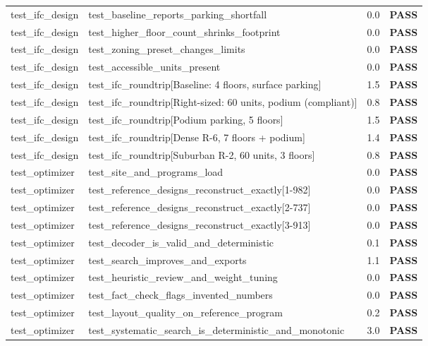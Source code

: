 \documentclass[10pt]{article}
\begin{document}
{\begin{longtable}{p{2.6cm}p{9.6cm}p{1.0cm}p{1.4cm}}
test\_ifc\_design & test\_baseline\_reports\_parking\_shortfall & 0.0 & \textcolor{pass}{\textbf{PASS}} \\
test\_ifc\_design & test\_higher\_floor\_count\_shrinks\_footprint & 0.0 & \textcolor{pass}{\textbf{PASS}} \\
test\_ifc\_design & test\_zoning\_preset\_changes\_limits & 0.0 & \textcolor{pass}{\textbf{PASS}} \\
test\_ifc\_design & test\_accessible\_units\_present & 0.0 & \textcolor{pass}{\textbf{PASS}} \\
test\_ifc\_design & test\_ifc\_roundtrip[Baseline: 4 floors, surface parking] & 1.5 & \textcolor{pass}{\textbf{PASS}} \\
test\_ifc\_design & test\_ifc\_roundtrip[Right-sized: 60 units, podium (compliant)] & 0.8 & \textcolor{pass}{\textbf{PASS}} \\
test\_ifc\_design & test\_ifc\_roundtrip[Podium parking, 5 floors] & 1.5 & \textcolor{pass}{\textbf{PASS}} \\
test\_ifc\_design & test\_ifc\_roundtrip[Dense R-6, 7 floors + podium] & 1.4 & \textcolor{pass}{\textbf{PASS}} \\
test\_ifc\_design & test\_ifc\_roundtrip[Suburban R-2, 60 units, 3 floors] & 0.8 & \textcolor{pass}{\textbf{PASS}} \\
test\_optimizer & test\_site\_and\_programs\_load & 0.0 & \textcolor{pass}{\textbf{PASS}} \\
test\_optimizer & test\_reference\_designs\_reconstruct\_exactly[1-982] & 0.0 & \textcolor{pass}{\textbf{PASS}} \\
test\_optimizer & test\_reference\_designs\_reconstruct\_exactly[2-737] & 0.0 & \textcolor{pass}{\textbf{PASS}} \\
test\_optimizer & test\_reference\_designs\_reconstruct\_exactly[3-913] & 0.0 & \textcolor{pass}{\textbf{PASS}} \\
test\_optimizer & test\_decoder\_is\_valid\_and\_deterministic & 0.1 & \textcolor{pass}{\textbf{PASS}} \\
test\_optimizer & test\_search\_improves\_and\_exports & 1.1 & \textcolor{pass}{\textbf{PASS}} \\
test\_optimizer & test\_heuristic\_review\_and\_weight\_tuning & 0.0 & \textcolor{pass}{\textbf{PASS}} \\
test\_optimizer & test\_fact\_check\_flags\_invented\_numbers & 0.0 & \textcolor{pass}{\textbf{PASS}} \\
test\_optimizer & test\_layout\_quality\_on\_reference\_program & 0.2 & \textcolor{pass}{\textbf{PASS}} \\
test\_optimizer & test\_systematic\_search\_is\_deterministic\_and\_monotonic & 3.0 & \textcolor{pass}{\textbf{PASS}} \\
\bottomrule
\end{longtable}}
\end{document}
